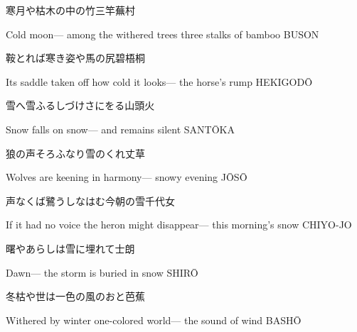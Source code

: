 \begin{haiku}
    {\FH 寒月や枯木の中の竹三竿}\hfill{\FH 蕪村}

    \vin{} Cold moon---
    \vin{} \vin{} among the withered trees
    \vin{} \vin{} \vin{} three stalks of bamboo \hspace{\fill} BUSON
\end{haiku}

\begin{haiku}
    {\FH 鞍とれば寒き姿や馬の尻}\hfill{\FH 碧梧桐}

    \vin{} Its saddle taken off
    \vin{} \vin{} how cold it looks---
    \vin{} \vin{} \vin{} the horse's rump \hspace{\fill} HEKIGOD\={O}
\end{haiku}

\begin{haiku}
    {\FH 雪へ雪ふるしづけさにをる}\hfill{\FH 山頭火}

    \vin{} Snow
    \vin{} \vin{} falls on snow---
    \vin{} \vin{} \vin{} and remains silent \hspace{\fill} SANT\={O}KA
\end{haiku}

\begin{haiku}
    {\FH 狼の声そろふなり雪のくれ}\hfill{\FH 丈草}

    \vin{} Wolves
    \vin{} \vin{} are keening in harmony---
    \vin{} \vin{} \vin{} snowy evening \hspace{\fill} J\={O}S\={O}
\end{haiku}

\begin{haiku}
    {\FH 声なくば鷺うしなはむ今朝の雪}\hfill{\FH 千代女}

    \vin{} If it had no voice
    \vin{} \vin{} the heron might disappear---
    \vin{} \vin{} \vin{} this morning's snow \hspace{\fill} CHIYO-JO
\end{haiku}

\begin{haiku}
    {\FH 曙やあらしは雪に埋れて}\hfill{\FH 士朗}

    \vin{} Dawn---
    \vin{} \vin{} the storm is buried
    \vin{} \vin{} \vin{} in snow \hspace{\fill} SHIR\={O}
\end{haiku}

\begin{haiku}
    {\FH 冬枯や世は一色の風のおと}\hfill{\FH 芭蕉}

    \vin{} Withered by winter
    \vin{} \vin{} one-colored world---
    \vin{} \vin{} \vin{} the sound of wind \hspace{\fill} BASH\={O}
\end{haiku}

